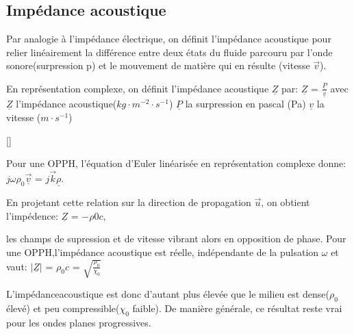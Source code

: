 \documentclass[a4paper, 12pt]{article}
\begin{document}
\subsection{Impédance acoustique}

\begin{text}
Par analogie à l'impédance électrique, on définit l'impédance acoustique pour relier linéairement la différence entre deux états du fluide parcouru par l'onde sonore(surpression p) et le mouvement de matière qui en résulte (vitesse $\vec v$).
\end{text}
\begin{defn}[]
En représentation complexe, on définit l'impédance acoustique $\underline{Z}$ par:\newline 
$\underline{Z}$ = $\frac{\underline{P}}{\underline{v}}$\newline
avec $\underline{Z}$ l'impédance acoustique($kg\cdot m^{-2}\cdot s^{-1}$)\newline
$\underline{P}$ la surpression en pascal (Pa)\newline
$\underline{v}$ la vitesse ($m \cdot s^{-1}$)\newline
\end{defn}[]
\begin{text}
Pour une OPPH, l'équation d'Euler linéarisée en représentation complexe donne: \newline 
$j\omega \rho_{0}\vec \underline{v}$ = $j\vec k\underline{\rho}$.\newline

En projetant cette relation sur la direction de propagation $\vec u$, on obtient l'impédence:\newline 
$\underline{Z}$ = $-\rho{0}c$,\newline

les champs de supression et de vitesse vibrant alors en opposition de phase.\newline 
Pour une OPPH,l'impédance acoustique est réelle, indépendante de la pulsation $\omega$ et vaut:\newline
$|\underline{Z}|$ = $\rho_{0}c$ = $\sqrt{\frac{\rho_{0}}{\chi_{0}}}$\newline 

L'impédanceacoustique est donc d'autant plus élevée que le milieu est dense($\rho_{0}$ élevé) et peu compressible($\chi_{0}$ faible). De manière générale, ce résultat reste vrai pour les ondes planes progressives.
\end{text}
\end{document}
